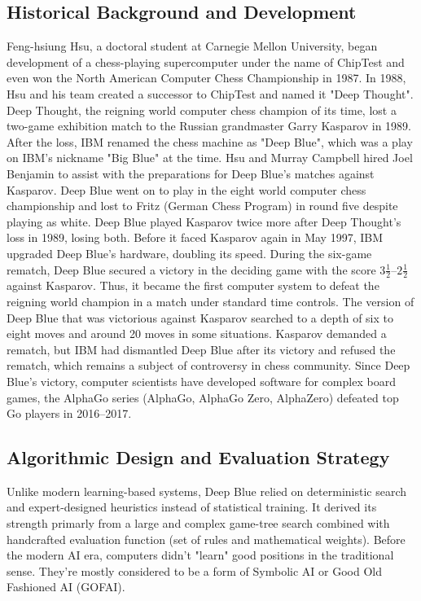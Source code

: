 \documentclass[11pt,a4paper]{report}
\begin{document}
\subsection{Historical Background and Development}
Feng-hsiung Hsu, a doctoral student at Carnegie Mellon University, began development of a chess-playing supercomputer under the name of ChipTest
and even won the North American Computer Chess Championship in 1987. In 1988, Hsu and his team created a successor to ChipTest and named it "Deep Thought".
Deep Thought, the reigning world computer chess champion of its time, lost a two-game exhibition match to the Russian grandmaster Garry Kasparov in 1989.
After the loss, IBM renamed the chess machine as "Deep Blue", which was a play on IBM's nickname "Big Blue" at the time. Hsu and Murray Campbell hired Joel
Benjamin to assist with the preparations for Deep Blue's matches against Kasparov. Deep Blue went on to play in the eight world computer chess championship and
lost to Fritz (German Chess Program) in round five despite playing as white. Deep Blue played Kasparov twice more after Deep Thought's loss in 1989, losing both.
Before it faced Kasparov again in May 1997, IBM upgraded Deep Blue's hardware, doubling its speed. During the six-game rematch, Deep Blue secured a victory in the
deciding game with the score $3\frac{1}{2}$--$2\frac{1}{2}$ against Kasparov. Thus, it became the first computer system to defeat the reigning world champion in a
match under standard time controls. The version of Deep Blue that was victorious against Kasparov searched to a depth of six to eight moves and around 20 moves in
some situations. Kasparov demanded a rematch, but IBM had dismantled Deep Blue after its victory and refused the rematch, which remains a subject of controversy
in chess community. Since Deep Blue's victory, computer scientists have developed software for complex board games, the AlphaGo series (AlphaGo, AlphaGo Zero, AlphaZero)
defeated top Go players in 2016--2017.

\subsection{Algorithmic Design and Evaluation Strategy}
Unlike modern learning-based systems, Deep Blue relied on deterministic search and expert-designed heuristics instead of statistical training.
It derived its strength primarly from a large and complex game-tree search combined with handcrafted evaluation function (set of rules and
mathematical weights). Before the modern AI era, computers didn't "learn" good positions in the traditional sense. They're mostly considered to be
a form of Symbolic AI or Good Old Fashioned AI (GOFAI).
\end{document}
